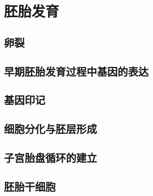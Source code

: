 \chapter{胚胎发育}

\section{卵裂}

\section{早期胚胎发育过程中基因的表达}

\section{基因印记}

\section{细胞分化与胚层形成}

\section{子宫胎盘循环的建立}

\section{胚胎干细胞}